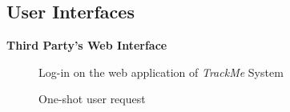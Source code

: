 \subsection{User Interfaces}

\begin{center}
	\textbf{Third Party's Web Interface}
\end{center}

\begin{figure}[H]
    \centering
    \caption{Log-in on the web application of  \emph{TrackMe} System}
\end{figure}

\begin{figure}[H]
    \centering
    \caption{One-shot user request}
\end{figure}

